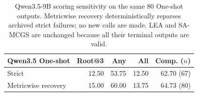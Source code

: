 \begin{table}[t]
\centering\small
\begin{tabular}{lrrrr}
\toprule
Qwen3.5 One-shot & Root@3 & Any & All & Comp. ($n$) \\
\midrule
Strict & 12.50 & 53.75 & 12.50 & 62.70 (67) \\
Metricwise recovery & 15.00 & 60.00 & 13.75 & 64.73 (80) \\
\bottomrule\end{tabular}
\caption{Qwen3.5-9B scoring sensitivity on the same 80 One-shot outputs. Metricwise recovery deterministically reparses archived strict failures; no new calls are made. LEA and SA-MCGS are unchanged because all their terminal outputs are valid.}
\label{tab:qwen_scoring_sensitivity}
\end{table}
